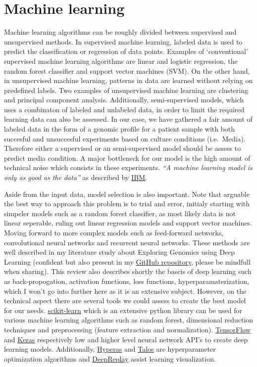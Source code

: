 \documentclass[11pt,]{article}
\begin{document}
\hypertarget{machine-learning}{%
\section{Machine learning}\label{machine-learning}}

Machine learning algorithms can be roughly divided between supervised
and unsupervised methods. In supervised machine learning, labeled data
is used to predict the classification or regression of data points.
Examples of `conventional' supervised machine learning algorithms are
linear and logistic regression, the random forest classifier and support
vector machines (SVM). On the other hand, in unsupervised machine
learning, patterns in data are learned without relying on predefined
labels. Two examples of unsupervised machine learning are clustering and
principal component analysis. Additionally, semi-supervised models,
which uses a combinaton of labeled and unlabeled data, in order to limit
the required learning data can also be assessed. In our case, we have
gathered a fair amount of labeled data in the form of a genomic profile
for a patient sample with both succesful and unsuccesful experiments
based on culture conditions (i.e.~Media). Therefore either a supervised
or an semi-supervised model should be assess to predict media condition.
A major bottleneck for our model is the high amount of technical noise
which consists in these experiments. \emph{``A machine learning model is
only as good as the data''} as described by
\href{http://www.research.ibm.com/5-in-5/ai-and-bias/}{IBM}.

Aside from the input data, model selection is also important. Note that
arguable the best way to approach this problem is to trial and error,
initialy starting with simpeler models such as a random forest
classifier, as most likely data is not linear seperable, ruling out
linear regression models and support vector machines. Moving forward to
more complex models such as feed-forward networks, convolutional neural
networks and recurrent neural networks. These methods are well described
in my literature study about Exploring Genomics using Deep Learning
(confident but also present in my
\href{https://github.com/Douwe-Spaanderman/Broad_DJ_AI}{GitHub
repository}, please be mindfull when sharing). This review also
describes shortly the bascis of deep learning such as back-propogation,
activation functions, loss functions, hyperparamaterization, which I
won't go into further here as it is an extensive subject. However, on
the technical aspect there are several tools we could assess to create
the best model for our needs.
\href{https://scikit-learn.org/stable/}{scikit-learn} which is an
extensive python library can be used for various machine learning
algorithms such as random forest, dimensional reduction techniques and
preprocessing (feature extraction and normalization).
\href{https://www.tensorflow.org/}{TensorFlow} and
\href{https://keras.io/}{Keras} respectively low and higher level neural
network API's to create deep learning models. Additionally,
\href{https://github.com/maxpumperla/hyperas}{Hyperas} and
\href{https://github.com/autonomio/talos}{Talos} are hyperparameter
optimization algorithms and
\href{https://github.com/dvgodoy/deepreplay}{DeepReplay} assist learning
visualization.
\end{document}
